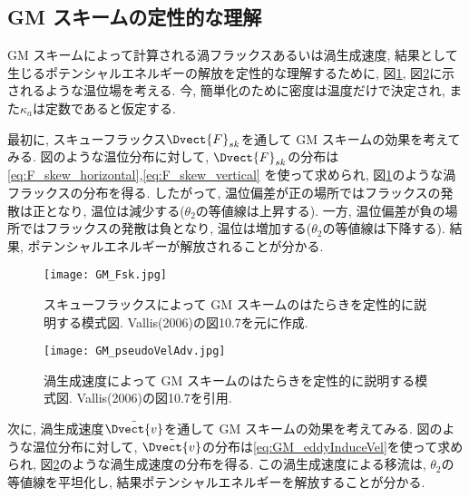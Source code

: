 \subsection{GM スキームの定性的な理解}
GM スキームによって計算される渦フラックスあるいは渦生成速度,
結果として生じるポテンシャルエネルギーの解放を定性的な理解するために,
図\ref{fig:GM_Fsk}, 図\ref{fig:GM_pseudoVelAdv}に示されるような温位場を考える.
今, 簡単化のために密度は温度だけで決定され, また$\kappa_a$は定数であると仮定する.

最初に, スキューフラックス$\Dvect{F}_{sk}$を通して GM スキームの効果を考えてみる.
図のような温位分布に対して, $\Dvect{F}_{sk}$の分布は\eqref{eq:F_skew_horizontal},\eqref{eq:F_skew_vertical}
を使って求められ, 図\ref{fig:GM_Fsk}のような渦フラックスの分布を得る.
したがって, 温位偏差が正の場所ではフラックスの発散は正となり, 温位は減少する($\theta_2$の等値線は上昇する).
一方, 温位偏差が負の場所ではフラックスの発散は負となり, 温位は増加する($\theta_2$の等値線は下降する).
結果, ポテンシャルエネルギーが解放されることが分かる. 
 \begin{figure}[t]
  \begin{center}
  \texttt{[image: GM\_Fsk.jpg]}
  \caption{スキューフラックスによって GM スキームのはたらきを定性的に説明する模式図. Vallis(2006)の図10.7を元に作成.}  
  \end{center}
  \label{fig:GM_Fsk}
 \end{figure}
 \begin{figure}
  \begin{center}
 \texttt{[image: GM\_pseudoVelAdv.jpg]}
 \caption{渦生成速度によって GM スキームのはたらきを定性的に説明する模式図. Vallis(2006)の図10.7を引用.}   
  \end{center}
  \label{fig:GM_pseudoVelAdv}
 \end{figure}

次に, 渦生成速度$\tilde{\Dvect{v}}$を通して GM スキームの効果を考えてみる.
図のような温位分布に対して, $\tilde{\Dvect{v}}$の分布は\eqref{eq:GM_eddyInduceVel}を使って求められ,
図\ref{fig:GM_pseudoVelAdv}のような渦生成速度の分布を得る.
この渦生成速度による移流は, $\theta_2$の等値線を平坦化し,
結果ポテンシャルエネルギーを解放することが分かる. 